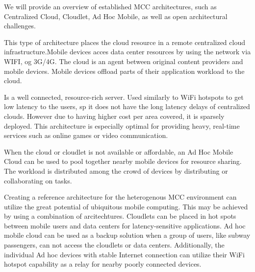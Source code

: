 We will provide an overview of established MCC architectures, such as Centralized Cloud, Cloudlet, Ad Hoc Mobile, as well as open architectural challenges.
\begin{description}[style=nextline]
\item [Centralized Cloud]
This type of architecture places the cloud resource in a remote centralized cloud infrastructure\cite[p.3]{liu2013gearing}.Mobile devices acces data center resources by using the network via WIFI, og 3G/4G. The cloud is an agent between original content providers and mobile devices. Mobile devices offload parts of their application workload to the cloud.
\item [Cloudlet]
Is a well connected, resource-rich server\cite[p.3-4]{liu2013gearing}. Used similarly to WiFi hotspots to get low latency to the users, sp it does not have the long latency delays of centralized clouds. However due to having higher cost per area covered, it is sparsely deployed. This architecture is especially optimal for providing heavy, real-time services such as online games or video communication.
\item [Ad Hoc Mobile Cloud]
When the cloud or cloudlet is not available or affordable, an Ad Hoc Mobile Cloud can be used to pool together nearby mobile devices for resource sharing\cite[p.4]{liu2013gearing}. The workload is distributed among the crowd of devices by distributing or collaborating on tasks.
\item [Architectural Challenges]
Creating a reference architecture for the heterogenous MCC environment can utilize the great potential of ubiquitous mobile computing\cite{sanaei2014heterogeneity}. This may be achieved by using a combination of arcitechtures. Cloudlets can be placed in hot spots between mobile users and data centers for latency-sensitive applications. Ad hoc mobile cloud can be used as a backup solution when a group of users, like subway passengers, can not access the cloudlets or data centers. Additionally, the individual Ad hoc devices with stable Internet connection can utilize their WiFi hotspot capability as a relay for nearby poorly connected devices.




\end{description}